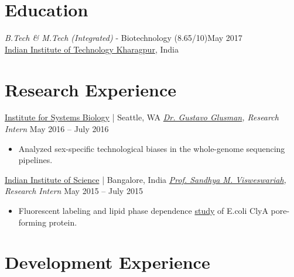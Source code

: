 \documentclass[letter]{res}
\begin{document}
\address{ \texttt{\href{mailto:vivekrai@iitkgp.ac.in}{vivekrai@iitkgp.ac.in} }}
\address{
  \texttt{\url{vivekiitkgp.github.io} }} 
\begin{resume}
  \noindent\makebox[\linewidth]{\rule{\paperwidth}{0.4pt}}

\section{Education}
\vspace{1mm}
{\sl B.Tech \& M.Tech (Integrated)} - Biotechnology (8.65/10)\hfill May 2017\\
\href{http://iitkgp.ac.in}{Indian Institute of Technology Kharagpur}, India

\section{Research Experience}
\vspace{1mm}
\href{http://systemsbiology.org/}{Institute for Systems Biology} | Seattle, WA \newline
 {\sl \href{https://www.systemsbiology.org/bio/gustavo-glusman-phd/}{Dr. Gustavo Glusman}, Research Intern} \hfill May 2016 – July 2016\\
 \vspace{-2mm}
 \begin{itemize}
  \item Analyzed sex-specific technological biases in the whole-genome sequencing pipelines.
 \end{itemize}
  \vspace{-2mm}

\href{http://www.iisc.ernet.in/}{Indian Institute of Science} | Bangalore, India \newline
{\sl \href{http://mrdg.iisc.ernet.in/sandhyav/index.htm}{Prof. Sandhya M. Visweswariah}, Research Intern} \hfill May 2015 – July 2015\\
  \vspace{-2mm}
  \begin{itemize}
    \item Fluorescent labeling and lipid phase dependence \href{https://vivekiitkgp.github.io/science/intern-at-iisc-2.html}{study} of E.coli ClyA pore-forming protein.
  \end{itemize}
  \vspace{-2mm}

\section{Development Experience}
\vspace{1mm}


\end{resume}
\end{document}
